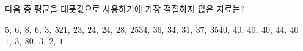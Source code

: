 다음 중 평균을 대푯값으로 사용하기에 가장 적절하지 \underline{않은} 자료는?
\begin{choicesv}{$5,\ 6,\ 8,\ 6,\ 3,\ 5$}{$21,\ 23,\ 24,\ 24,\ 28,\ 25$}{$34,\ 36,\ 34,\ 31,\ 37,\ 35$}{$40,\ 40,\ 40,\ 40,\ 44,\ 40$}{$1,\ 3,\ 80,\ 3,\ 2,\ 1$}\end{choicesv}
